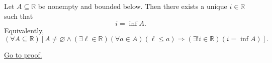 \begin{theorem}
\label{thm:glb-property-implies-existence-of-infima}
Let $A\subseteq\mathbb{R}$ be nonempty and bounded below. Then there
exists a unique $i\in\mathbb{R}$ such that
\[
  i=\inf A.
\]
Equivalently,
\[
  (\forall A\subseteq\mathbb{R})
  \left[
    A\neq\varnothing
    \land
    (\exists \ell\in\mathbb{R})(\forall a\in A)(\ell\leq a)
    \Longrightarrow
    (\exists!i\in\mathbb{R})(i=\inf A)
  \right].
\]

\hyperref[prf:glb-property-implies-existence-of-infima]{Go to proof.}
\end{theorem}